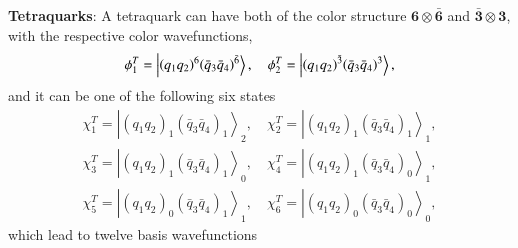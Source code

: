 \documentclass[12pt,prd,onecolumn,floatfix,nofootinbib]{revtex4}
\begin{document}
\textbf{Tetraquarks}: A tetraquark can have both of the color structure $%
\boldsymbol{6}\otimes \boldsymbol{\bar{6}}$ and $\boldsymbol{\bar{3}}\otimes
\boldsymbol{3}$, with the respective color wavefunctions,
\begin{equation}
\phi _{1}^{T}=\left\vert {\left( q_{1}q_{2}\right) }^{6}{\left( \bar{q}_{3}%
\bar{q}_{4}\right) }^{\bar{6}}\right\rangle ,\quad \phi _{2}^{T}=\left\vert {%
\left( q_{1}q_{2}\right) }^{\bar{3}}{\left( \bar{q}_{3}\bar{q}_{4}\right) }%
^{3}\right\rangle ,  \label{colorT}
\end{equation}%
and it can be one of the following six states
\begin{equation}
\begin{aligned} \chi_{1}^{T}={\left| {\left(q_{1}q_{2}\right)}_{1}
{\left(\bar{q}_{3}\bar{q}_{4}\right)}_{1} \right\rangle}_{2}, \quad
\chi_{2}^{T}={\left| {\left(q_{1}q_{2}\right)}_{1}
{\left(\bar{q}_{3}\bar{q}_{4}\right)}_{1} \right\rangle}_{1}, \\
\chi_{3}^{T}={\left| {\left(q_{1}q_{2}\right)}_{1}
{\left(\bar{q}_{3}\bar{q}_{4}\right)}_{1} \right\rangle}_{0}, \quad
\chi_{4}^{T}={\left| {\left(q_{1}q_{2}\right)}_{1}
{\left(\bar{q}_{3}\bar{q}_{4}\right)}_{0} \right\rangle}_{1}, \\
\chi_{5}^{T}={\left| {\left(q_{1}q_{2}\right)}_{0}
{\left(\bar{q}_{3}\bar{q}_{4}\right)}_{1} \right\rangle}_{1}, \quad
\chi_{6}^{T}={\left| {\left(q_{1}q_{2}\right)}_{0}
{\left(\bar{q}_{3}\bar{q}_{4}\right)}_{0} \right\rangle}_{0}, \end{aligned}
\label{spinT}
\end{equation}%
which lead to twelve basis wavefunctions
\end{document}
